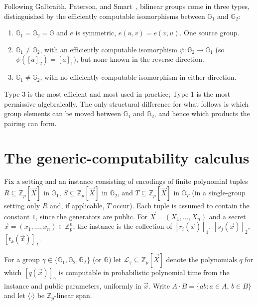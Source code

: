 \documentclass{aicr-solution}
\newcommand{\G}{\mathbb{G}}
\newcommand{\Gone}{\mathbb{G}_1}
\newcommand{\Gtwo}{\mathbb{G}_2}
\newcommand{\GT}{\mathbb{G}_T}
\newcommand{\Zp}{\mathbb{Z}_p}
\newcommand{\vx}{\vec{x}}
\newcommand{\vX}{\vec{X}}
\newcommand{\LL}{\mathcal{L}}
\newcommand{\Span}[1]{\langle #1 \rangle} %
\begin{document}
Following Galbraith, Paterson, and Smart~\cite{GPS08}, bilinear groups come in three types,
distinguished by the efficiently computable isomorphisms between $\Gone$ and $\Gtwo$:
\begin{enumerate}[label=\textup{Type~\arabic*.},leftmargin=4.4em,itemsep=3pt]
  \item $\Gone=\Gtwo=\G$ and $e$ is symmetric, $e(u,v)=e(v,u)$. One source group.
  \item $\Gone\neq\Gtwo$, with an efficiently computable isomorphism
        $\psi\colon\Gtwo\to\Gone$ (so $\psi([a]_2)=[a]_1$), but none known in the reverse
        direction.
  \item $\Gone\neq\Gtwo$, with no efficiently computable isomorphism in either direction.
\end{enumerate}
Type 3 is the most efficient and most used in practice; Type 1 is the most permissive
algebraically. The only structural difference for what follows is which group elements can
be moved between $\Gone$ and $\Gtwo$, and hence which products the pairing can form.

\section{The generic-computability calculus}

Fix a setting and an instance consisting of encodings of finite polynomial tuples
$R\subseteq\Zp[\vX]$ in $\Gone$, $S\subseteq\Zp[\vX]$ in $\Gtwo$, and $T\subseteq\Zp[\vX]$
in $\GT$ (in a single-group setting only $R$ and, if applicable, $T$ occur). Each tuple is
assumed to contain the constant $1$, since the generators are public. For $\vX=(X_1,\dots,X_n)$
and a secret $\vx=(x_1,\dots,x_n)\in\Zp^{n}$, the instance is the collection of $[r_i(\vx)]_1$,
$[s_j(\vx)]_2$, $[t_k(\vx)]_T$.

For a group $\gamma\in\{\Gone,\Gtwo,\GT\}$ (or $\G$) let $\LL_\gamma\subseteq\Zp[\vX]$
denote the polynomials $q$ for which $[q(\vx)]_\gamma$ is computable in probabilistic
polynomial time from the instance and public parameters, uniformly in $\vx$. Write
$A\cdot B=\{ab:a\in A,\,b\in B\}$ and let $\Span{\cdot}$ be $\Zp$-linear span.
\end{document}
